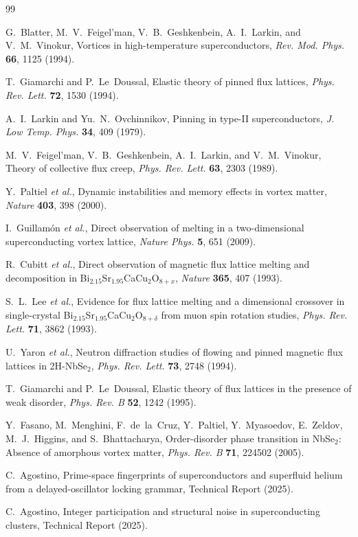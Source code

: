 \documentclass[reprint,aps,prb,superscriptaddress,floatfix]{revtex4-2}
\begin{document}


\begin{thebibliography}{99}

G.~Blatter, M.~V.~Feigel'man, V.~B.~Geshkenbein, A.~I.~Larkin, and V.~M.~Vinokur,
Vortices in high-temperature superconductors,
\emph{Rev. Mod. Phys.} \textbf{66}, 1125 (1994).

T.~Giamarchi and P.~Le~Doussal,
Elastic theory of pinned flux lattices,
\emph{Phys. Rev. Lett.} \textbf{72}, 1530 (1994).

A.~I.~Larkin and Yu.~N.~Ovchinnikov,
Pinning in type-II superconductors,
\emph{J. Low Temp. Phys.} \textbf{34}, 409 (1979).

M.~V.~Feigel'man, V.~B.~Geshkenbein, A.~I.~Larkin, and V.~M.~Vinokur,
Theory of collective flux creep,
\emph{Phys. Rev. Lett.} \textbf{63}, 2303 (1989).

Y.~Paltiel \emph{et al.},
Dynamic instabilities and memory effects in vortex matter,
\emph{Nature} \textbf{403}, 398 (2000).

I.~Guillamón \emph{et al.},
Direct observation of melting in a two-dimensional superconducting vortex lattice,
\emph{Nature Phys.} \textbf{5}, 651 (2009).

R.~Cubitt \emph{et al.},
Direct observation of magnetic flux lattice melting and decomposition in Bi$_{2.15}$Sr$_{1.95}$CaCu$_2$O$_{8+x}$,
\emph{Nature} \textbf{365}, 407 (1993).

S.~L.~Lee \emph{et al.},
Evidence for flux lattice melting and a dimensional crossover in single-crystal Bi$_{2.15}$Sr$_{1.95}$CaCu$_{2}$O$_{8+\delta}$ from muon spin rotation studies,
\emph{Phys. Rev. Lett.} \textbf{71}, 3862 (1993).

U.~Yaron \emph{et al.},
Neutron diffraction studies of flowing and pinned magnetic flux lattices in 2H-NbSe$_2$,
\emph{Phys. Rev. Lett.} \textbf{73}, 2748 (1994).

T.~Giamarchi and P.~Le~Doussal,
Elastic theory of flux lattices in the presence of weak disorder,
\emph{Phys. Rev. B} \textbf{52}, 1242 (1995).

Y.~Fasano, M.~Menghini, F.~de~la~Cruz, Y.~Paltiel, Y.~Myasoedov, E.~Zeldov, M.~J.~Higgins, and S.~Bhattacharya,
Order-disorder phase transition in NbSe$_2$: Absence of amorphous vortex matter,
\emph{Phys. Rev. B} \textbf{71}, 224502 (2005).

C.~Agostino,
Prime-space fingerprints of superconductors and superfluid helium from a delayed-oscillator locking grammar,
Technical Report (2025).

C.~Agostino,
Integer participation and structural noise in superconducting clusters,
Technical Report (2025).

\end{thebibliography}
\end{document}
